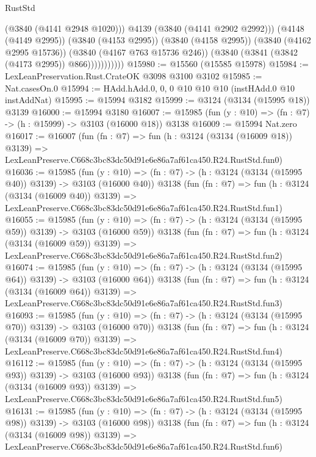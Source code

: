 \begin{lexlean}{RustStd}
\begin{coremodule}
                          (@3840 (@4141 @2948 @1020)))
                        @4139
                        (@3840 (@4141 @2902 @2992)))
                      (@4148 (@4149 @2995))
                      (@3840 (@4153 @2995))
                      (@3840 (@4158 @2995))
                      (@3840 (@4162 @2995 @15736))
                      (@3840 (@4167 @763 @15736 @246))
                      (@3840 (@3841 (@3842 (@4173 @2995)) @866)))))))))))
@15980 := @15560 (@15585 @15978)
@15984 := LexLeanPreservation.Rust.CrateOK @3098 @3100 @3102
@15985 := Nat.casesOn.{0}
@15994 := HAdd.hAdd.{0, 0, 0} @10 @10 @10 (instHAdd.{0} @10 instAddNat)
@15995 := @15994 @3182
@15999 := @3124 (@3134 (@15995 @18)) @3139
@16000 := @15994 @3180
@16007 := @15985 (fun (y : @10) => (fn : @7) -> (h : @15999) -> @3103 (@16000 @18)) @3138
@16009 := @15994 Nat.zero
@16017 := @16007
    (fun (fn : @7) =>
    fun (h : @3124 (@3134 (@16009 @18)) @3139) =>
    LexLeanPreserve.C668c3bc83dc50d91e6e86a7af61ca450.R24.RustStd.fun0)
@16036 := @15985
    (fun (y : @10) => (fn : @7) -> (h : @3124 (@3134 (@15995 @40)) @3139) -> @3103 (@16000 @40))
    @3138
    (fun (fn : @7) =>
    fun (h : @3124 (@3134 (@16009 @40)) @3139) =>
    LexLeanPreserve.C668c3bc83dc50d91e6e86a7af61ca450.R24.RustStd.fun1)
@16055 := @15985
    (fun (y : @10) => (fn : @7) -> (h : @3124 (@3134 (@15995 @59)) @3139) -> @3103 (@16000 @59))
    @3138
    (fun (fn : @7) =>
    fun (h : @3124 (@3134 (@16009 @59)) @3139) =>
    LexLeanPreserve.C668c3bc83dc50d91e6e86a7af61ca450.R24.RustStd.fun2)
@16074 := @15985
    (fun (y : @10) => (fn : @7) -> (h : @3124 (@3134 (@15995 @64)) @3139) -> @3103 (@16000 @64))
    @3138
    (fun (fn : @7) =>
    fun (h : @3124 (@3134 (@16009 @64)) @3139) =>
    LexLeanPreserve.C668c3bc83dc50d91e6e86a7af61ca450.R24.RustStd.fun3)
@16093 := @15985
    (fun (y : @10) => (fn : @7) -> (h : @3124 (@3134 (@15995 @70)) @3139) -> @3103 (@16000 @70))
    @3138
    (fun (fn : @7) =>
    fun (h : @3124 (@3134 (@16009 @70)) @3139) =>
    LexLeanPreserve.C668c3bc83dc50d91e6e86a7af61ca450.R24.RustStd.fun4)
@16112 := @15985
    (fun (y : @10) => (fn : @7) -> (h : @3124 (@3134 (@15995 @93)) @3139) -> @3103 (@16000 @93))
    @3138
    (fun (fn : @7) =>
    fun (h : @3124 (@3134 (@16009 @93)) @3139) =>
    LexLeanPreserve.C668c3bc83dc50d91e6e86a7af61ca450.R24.RustStd.fun5)
@16131 := @15985
    (fun (y : @10) => (fn : @7) -> (h : @3124 (@3134 (@15995 @98)) @3139) -> @3103 (@16000 @98))
    @3138
    (fun (fn : @7) =>
    fun (h : @3124 (@3134 (@16009 @98)) @3139) =>
    LexLeanPreserve.C668c3bc83dc50d91e6e86a7af61ca450.R24.RustStd.fun6)

\end{coremodule}
\end{lexlean}
